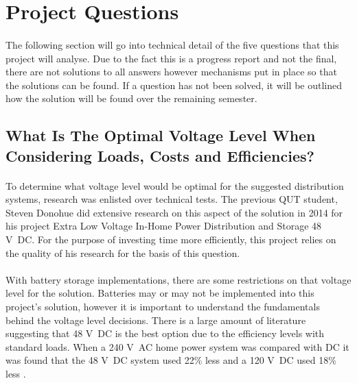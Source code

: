 \section{Project Questions}

\paragraph{}
The following section will go into technical detail of the five questions that this project will analyse. Due to the fact this is a progress report and not the final, there are not solutions to all answers however mechanisms put in place so that the solutions can be found. If a question has not been solved, it will be outlined how the solution will be found over the remaining semester. 

\subsection{What Is The Optimal Voltage Level When Considering Loads, Costs and Efficiencies?}

\paragraph{}
To determine what voltage level would be optimal for the suggested distribution systems, research was enlisted over technical tests. The previous QUT student, Steven Donohue did extensive research on this aspect of the solution in 2014 for his project Extra Low Voltage In-Home Power Distribution and Storage 48 \si{V DC}. For the purpose of investing time more efficiently, this project relies on the quality of his research for the basis of this question. 

\paragraph{}
With battery storage implementations, there are some restrictions on that voltage level for the solution. Batteries may or may not be implemented into this project's solution, however it is important to understand the fundamentals behind the voltage level decisions. There is a large amount of literature suggesting that 48 \si{V DC} is the best option due to the efficiency levels with standard loads. When a 240 \si{V AC} home power system was compared with DC it was found that the 48 \si{V DC} system used 22\% less and a 120 \si{V DC} used 18\% less \cite{Donohue2014}. 

